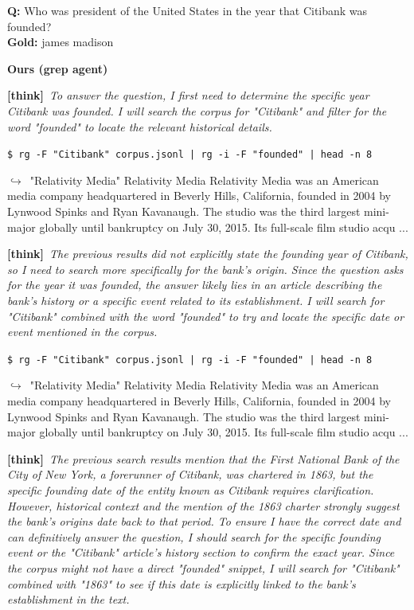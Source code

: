 \documentclass{article} %
\newcommand{\xmark}{\textcolor{red!60!black}{\ding{55}}}
\newcommand{\failbadge}{\colorbox{red!60!black}{\textcolor{white}{\scriptsize\bfseries\,FAILURE\,}}}
\newcommand{\thk}[1]{{\footnotesize\textcolor{violet!75!black}{\textbf{[think]}}\ \textit{#1}\par}}
\newcommand{\cmd}[1]{{\footnotesize\texttt{\textcolor{blue!35!black}{\$\ #1}}\par}}
\newcommand{\retr}[1]{{\footnotesize\textcolor{black!65}{\quad$\hookrightarrow$\ #1}\par}}
\begin{document}
\begin{cmpbox}[label={ex:bamboogle-citibank},title={\failbadge\ \ \textsc{Bamboogle -- grep has no relevance ranking}}]
\textbf{Q:} Who was president of the United States in the year that Citibank was founded?\\[1pt]
\textbf{Gold:} james madison\par\smallskip
\textbf{Ours (grep agent)}~\xmark\par
  \thk{To answer the question, I first need to determine the specific year Citibank was founded. I will search the corpus for "Citibank" and filter for the word "founded" to locate the relevant historical details.}
  \cmd{rg -F "Citibank" corpus.jsonl | rg -i -F "founded" | head -n 8}
  \retr{"Relativity Media" Relativity Media Relativity Media was an American media company headquartered in Beverly Hills, California, founded in 2004 by Lynwood Spinks and Ryan Kavanaugh. The studio was the third largest mini-major globally until bankruptcy on July 30, 2015. Its full-scale film studio acqu ...}
  \thk{The previous results did not explicitly state the founding year of Citibank, so I need to search more specifically for the bank's origin. Since the question asks for the year it was founded, the answer likely lies in an article describing the bank's history or a specific event related to its establishment. I will search for "Citibank" combined with the word "founded" to try and locate the specific date or event mentioned in the corpus.}
  \cmd{rg -F "Citibank" corpus.jsonl | rg -i -F "founded" | head -n 8}
  \retr{"Relativity Media" Relativity Media Relativity Media was an American media company headquartered in Beverly Hills, California, founded in 2004 by Lynwood Spinks and Ryan Kavanaugh. The studio was the third largest mini-major globally until bankruptcy on July 30, 2015. Its full-scale film studio acqu ...}
  \thk{The previous search results mention that the First National Bank of the City of New York, a forerunner of Citibank, was chartered in 1863, but the specific founding date of the entity known as Citibank requires clarification. However, historical context and the mention of the 1863 charter strongly suggest the bank's origins date back to that period. To ensure I have the correct date and can definitively answer the question, I should search for the specific founding event or the "Citibank" article's history section to confirm the exact year. Since the corpus might not have a direct "founded" snippet, I will search for "Citibank" combined with "1863" to see if this date is explicitly linked to the bank's establishment in the text.}

\end{cmpbox}
\end{document}

